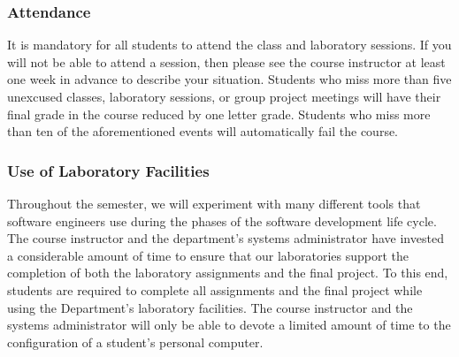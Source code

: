 \subsubsection*{Attendance}

It is mandatory for all students to attend the class and laboratory sessions. If you will not be able to attend a
session, then please see the course instructor at least one week in advance to describe your situation.  Students who
miss more than five unexcused classes, laboratory sessions, or group project meetings will have their final grade in the
course reduced by one letter grade. Students who miss more than ten of the aforementioned events will automatically fail
the course.

% 
% 

\subsubsection*{Use of Laboratory Facilities}

Throughout the semester, we will experiment with many different tools that software engineers use during the phases of
the software development life cycle.  The course instructor and the department's systems administrator have invested a
considerable amount of time to ensure that our laboratories support the completion of both the laboratory assignments and the
final project.  To this end, students are required to complete all assignments and the final project while using the
Department's laboratory facilities. The course instructor and the systems administrator will only be able to devote a
limited amount of time to the configuration of a student's personal computer.

